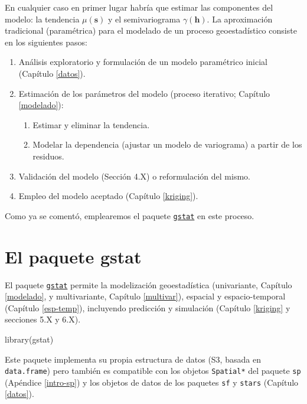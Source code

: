 \documentclass[
  spanish,
]{book}
\newenvironment{Shaded}{\begin{snugshade}}{\end{snugshade}}
\newcommand{\FunctionTok}[1]{\textcolor[rgb]{0.00,0.00,0.00}{#1}}
\newcommand{\NormalTok}[1]{#1}
\theoremstyle{break}
\theoremstyle{definition}
\theoremstyle{definition}
\theoremstyle{definition}
\theoremstyle{definition}
\theoremstyle{remark}
\begin{document}
En cualquier caso en primer lugar habría que estimar las componentes del modelo: la tendencia \(\mu(\mathbf{s})\) y el semivariograma \(\gamma(\mathbf{h})\).
La aproximación tradicional (paramétrica) para el modelado de un proceso geoestadístico consiste en los siguientes pasos:

\begin{enumerate}
\def\labelenumi{\arabic{enumi}.}
\item
  Análisis exploratorio y formulación de un modelo paramétrico inicial (Capítulo \ref{datos}).
\item
  Estimación de los parámetros del modelo (proceso iterativo; Capítulo \ref{modelado}):

  \begin{enumerate}
  \def\labelenumii{\arabic{enumii}.}
  \item
    Estimar y eliminar la tendencia.
  \item
    Modelar la dependencia (ajustar un modelo de variograma) a partir de los residuos.
  \end{enumerate}
\item
  Validación del modelo (Sección 4.X) o reformulación del mismo.
\item
  Empleo del modelo aceptado (Capítulo \ref{kriging}).
\end{enumerate}

Como ya se comentó, emplearemos el paquete \href{https://r-spatial.github.io/gstat}{\texttt{gstat}} en este proceso.

\hypertarget{el-paquete-gstat}{%
\section{\texorpdfstring{El paquete \textbf{gstat}}{El paquete gstat}}\label{el-paquete-gstat}}

El paquete \href{https://r-spatial.github.io/gstat}{\texttt{gstat}} permite la modelización geoestadística (univariante, Capítulo \ref{modelado}, y multivariante, Capítulo \ref{multivar}), espacial y espacio-temporal (Capítulo \ref{esp-temp}), incluyendo predicción y simulación (Capítulo \ref{kriging} y secciones 5.X y 6.X).

\begin{Shaded}
\begin{Highlighting}[]
\FunctionTok{library}\NormalTok{(gstat)}
\end{Highlighting}
\end{Shaded}

Este paquete implementa su propia estructura de datos (S3, basada en \texttt{data.frame}) pero también es compatible con los objetos \texttt{Spatial*} del paquete \texttt{sp} (Apéndice \ref{intro-sp}) y los objetos de datos de los paquetes \texttt{sf} y \texttt{stars} (Capítulo \ref{datos}).
\end{document}

